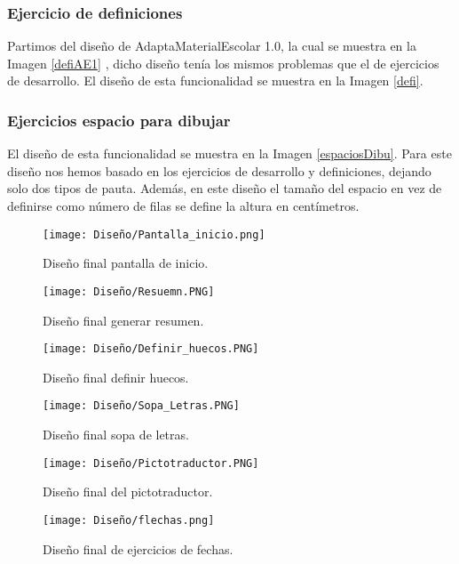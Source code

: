  \subsubsection{Ejercicio de definiciones}
 Partimos del diseño de AdaptaMaterialEscolar 1.0, la cual se muestra en la Imagen \ref{defiAE1} , dicho diseño tenía los mismos problemas que el de ejercicios de desarrollo. El diseño de esta funcionalidad se muestra en la Imagen \ref{defi}.

 \subsubsection{Ejercicios espacio para dibujar}
 El diseño de esta funcionalidad se muestra en la Imagen \ref{espaciosDibu}. Para este diseño nos hemos basado en los ejercicios de desarrollo y definiciones, dejando solo dos tipos de pauta. Además, en este diseño el tamaño del espacio en vez de definirse como número de filas se define la altura en centímetros.  


\begin{figure}[ht!]
  \centering
  \texttt{[image: Diseño/Pantalla\_inicio.png]}
  \caption{Diseño final pantalla de inicio.}
  \label{pantallaInicio}
\end{figure}

\begin{figure}[ht!]
  \centering
  \texttt{[image: Diseño/Resuemn.PNG]}
  \caption{Diseño final generar resumen.}
  \label{resuemn}
\end{figure}

\begin{figure}[ht!]
  \centering
  \texttt{[image: Diseño/Definir\_huecos.PNG]}
  \caption{Diseño final definir huecos.}
  \label{definir_hueco}
\end{figure}

\begin{figure}[ht!]
  \centering
  \texttt{[image: Diseño/Sopa\_Letras.PNG]}
  \caption{Diseño final sopa de letras.}
  \label{sopaLetras}
\end{figure}

\begin{figure}[ht!]
  \centering
  \texttt{[image: Diseño/Pictotraductor.PNG]}
  \caption{Diseño final del pictotraductor.}
  \label{pictotraductor}
\end{figure}

\begin{figure}[ht!]
  \centering
  \texttt{[image: Diseño/flechas.png]}
  \caption{Diseño final de ejercicios de fechas.}
  \label{flechas}
\end{figure}


